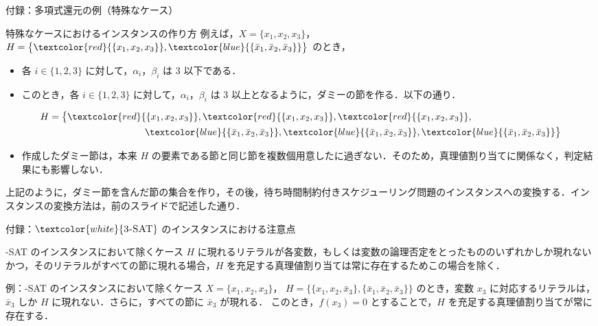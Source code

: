 \documentclass[dvipdfmx]{beamer}
\begin{document}
    \begin{frame}{付録：多項式還元の例（特殊なケース）}
      \begin{block}{特殊なケースにおけるインスタンスの作り方}
        例えば，$X = \{x_1,x_2,x_3\}$，$H = \big\{{\textcolor{red}{\{x_1,x_2,x_3\}}},{\textcolor{blue}{\{\bar x_1, \bar x_2, \bar x_3\}}}\big\}$ のとき，
        \begin{itemize}
          \item
          各 $i \in \{1,2,3\}$ に対して，$\alpha_i$，$\beta_i$ は 3 以下である．
          \item
          このとき，各 $i \in \{1,2,3\}$ に対して，$\alpha_i$，$\beta_i$ は 3 以上となるように，ダミーの節を作る．以下の通り．
        \end{itemize}
        \begin{equation}
          \begin{split}
            H &= \big\{
            {\textcolor{red}{\{x_1,x_2,x_3\}}},
            {\textcolor{red}{\{x_1,x_2,x_3\}}},
            {\textcolor{red}{\{x_1,x_2,x_3\}}},
            \\ & \qquad\qquad\qquad\qquad\qquad
            {\textcolor{blue}{\{\bar x_1, \bar x_2, \bar x_3\}}},
            {\textcolor{blue}{\{\bar x_1, \bar x_2, \bar x_3\}}},
            {\textcolor{blue}{\{\bar x_1, \bar x_2, \bar x_3\}}}
            \big\} \notag
          \end{split}
        \end{equation}
        \begin{itemize}
          \item 作成したダミー節は，本来 $H$ の要素である節と同じ節を複数個用意したに過ぎない．そのため，真理値割り当てに関係なく，判定結果にも影響しない．
        \end{itemize}
        上記のように，ダミー節を含んだ節の集合を作り，その後，待ち時間制約付きスケジューリング問題のインスタンスへの変換する．インスタンスの変換方法は，前のスライドで記述した通り．
      \end{block}
    \end{frame}

    \begin{frame}{付録：${\textcolor{white}{\mbox {\sc 3-SAT}}}$ のインスタンスにおける注意点}
      \begin{block}{{-SAT} のインスタンスにおいて除くケース}
        $H$ に現れるリテラルが各変数，もしくは変数の論理否定をとったもののいずれかしか現れないかつ，そのリテラルがすべての節に現れる場合，$H$ を充足する真理値割り当ては常に存在するためこの場合を除く．
      \end{block}

      \begin{exampleblock}{例：{-SAT} のインスタンスにおいて除くケース}
        $X = \{x_1,x_2,x_3\}$，
        $H = \big\{\{x_1,x_2,\bar x_3\}, \{\bar x_1, \bar x_2, \bar x_3\}\big\}$ のとき，変数 $x_3$ に対応するリテラルは，$\bar x_3$ しか $H$ に現れない．さらに，すべての節に $\bar x_3$ が現れる．
        このとき，$f(x_3) = 0$ とすることで，$H$ を充足する真理値割り当てが常に存在する．
      \end{exampleblock}
    \end{frame}
\end{document}
